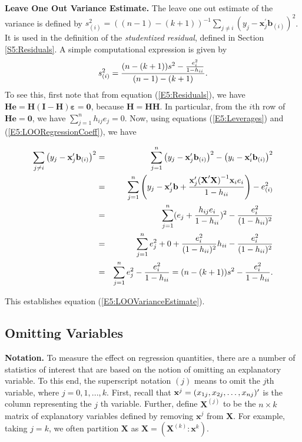 \textbf{Leave One Out Variance Estimate.} The leave one out estimate
of the variance is defined by
$s_{(i)}^2=((n-1)-(k+1))^{-1}\sum_{j\neq i}\left(
y_j-\mathbf{x}_j^{\prime}\mathbf{b}_{(i)}\right) ^2$. It is used in
the definition of the \textit{studentized residual}, defined in
Section \ref{S5:Residuals}. A simple computational expression is
given by
\begin{equation}\label{E5:LOOVarianceEstimate}
s_{(i)}^2=\frac{(n-(k+1))s^2-\frac{e_i^2}{1-h_{ii}}}{%
(n-1)-(k+1)}.
\end{equation}
To see this, first note that from equation (\ref{E5:Residuals}), we have $\mathbf{He%
}=\mathbf{H(I-H)\boldsymbol \varepsilon}=\mathbf{0}$, because
$\mathbf{H}=\mathbf{HH}$. In
particular, from the $i$th row of $\mathbf{He}=\mathbf{0}$, we have $%
\sum_{j=1}^{n}h_{ij}e_j=0$. Now, using equations
(\ref{E5:Leverages}) and (\ref{E5:LOORegressionCoeff}), we have

\begin{center}
\begin{eqnarray*}
\sum_{j\neq i}\left(
y_j-\mathbf{x}_j^{\prime}\mathbf{b}_{(i)}\right)
^2 &=&\sum_{j=1}^{n}\left( y_j-\mathbf{x}_j^{\prime}\mathbf{b}%
_{(i)}\right) ^2-\left( y_i-\mathbf{x}_i^{\prime}\mathbf{b}%
_{(i)}\right) ^2 \\
&=&\sum_{j=1}^{n}\left( y_j-\mathbf{x}_j^{\prime}\mathbf{b}+\frac{%
\mathbf{x}_j^{\prime}\mathbf{(X}^{\prime}\mathbf{X)}^{-1}\mathbf{x}_i%
e_i}{1-h_{ii}}\right) -e_{(i)}^2 \\
&=&\sum_{j=1}^{n}(e_j+\frac{h_{ij}e_i}{1-h_{ii}})^2-\frac{%
e_i^2}{(1-h_{ii})^2} \\
&=&\sum_{j=1}^{n}e_j^2+0+\frac{e_i^2}{(1-h_{ii})^2}%
h_{ii}-\frac{e_i^2}{(1-h_{ii})^2} \\
&=&\sum_{j=1}^{n}e_j^2-\frac{e_i^2}{1-h_{ii}}%
=(n-(k+1))s^2-\frac{e_i^2}{1-h_{ii}}.
\end{eqnarray*}%
\qquad
\end{center}

This establishes equation (\ref{E5:LOOVarianceEstimate}).

\subsection{Omitting Variables}

\textbf{Notation.} To measure the effect on regression quantities,
there are a number of statistics of interest that are based on the
notion of omitting an explanatory variable. To this end, the
superscript notation $(j)$ means
to omit the $j$th variable, where $j=0,1,...,k$. First, recall that $\mathbf{%
x}^{j}=(x_{1j},x_{2j},\ldots,x_{nj})^{\prime}$ is the column representing the $j$%
th variable. Further, define $\mathbf{X}^{(j)}$ to be the $n\times
k$ matrix
of explanatory variables defined by removing $\mathbf{x}^{j}$ from $\mathbf{X%
}$. For example, taking $j=k$, we often partition $\mathbf{X}$ as $\mathbf{X}%
=\left( \mathbf{X}^{(k)}: \mathbf{x}^k \right) $.



